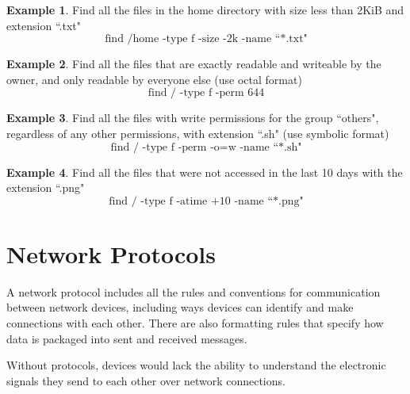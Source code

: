 \documentclass[12pt]{article}
\theoremstyle{definition}
\theoremstyle{definition}
\newtheorem{exmp}{Example}[section]
\begin{document}
        \begin{exmp}
            Find all the files in the home directory with size less than 2KiB
            and extension ``.txt"
            \begin{equation*}
                \text{find /home -type f -size -2k -name ``*.txt"}
            \end{equation*}
        \end{exmp}
        \begin{exmp}
            Find all the files that are exactly readable and writeable by the
            owner, and only readable by everyone else (use octal format)
            \begin{equation*}
                \text{find / -type f -perm 644}
            \end{equation*}
        \end{exmp}
        \begin{exmp}
            Find all the files with write permissions for the group ``others",
            regardless of any other permissions, with extension ``.sh" (use
            symbolic format)
            \begin{equation*}
                \text{find / -type f -perm -o=w -name ``*.sh"}
            \end{equation*}
        \end{exmp}
        \begin{exmp}
            Find all the files that were not accessed in the last 10 days with
            the extension ``.png"
            \begin{equation*}
                \text{find / -type f -atime +10 -name ``*.png"}
            \end{equation*}
        \end{exmp}
\section{Network Protocols}
    A network protocol includes all the rules and conventions for communication
    between network devices, including ways devices can identify and make
    connections with each other. There are also formatting rules that specify
    how data is packaged into sent and received messages. \par Without
    protocols, devices would lack the ability to understand the electronic
    signals they send to each other over network connections. 
\end{document}

